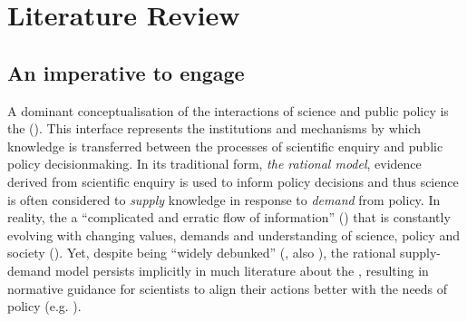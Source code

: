 \chapter{Literature Review}\label{ch:lit}

\section{An imperative to engage}\label{sec:litspi}


A dominant conceptualisation of the interactions of science and public policy is the \SPI{} (\cite{JagannathanEtAl2023}). This interface represents the institutions and mechanisms by which knowledge is transferred between the processes of scientific enquiry and public policy decisionmaking. In its traditional form, \emph{the rational model}, evidence derived from scientific enquiry is used to inform policy decisions and thus science is often considered to \emph{supply} knowledge in response to \emph{demand} from policy. In reality, the \SPI{} a ``complicated and erratic flow of information'' (\cite{BednarekSHG2015}) that is constantly evolving with changing values, demands and understanding of science, policy and society (\cite{Obermeister2020}). Yet, despite being ``widely debunked'' (\cite{BoswellS2017}, also \cite{McNie2007,HaynesDCRHGS2011,Cairney2018}), the rational supply-demand model persists implicitly in much literature about the \SPI, resulting in normative guidance for scientists to align their actions better with the needs of policy (e.g. \cite{McNie2007,GeddesDP2018,BlessenohlS2022,Bisbal2024}).

